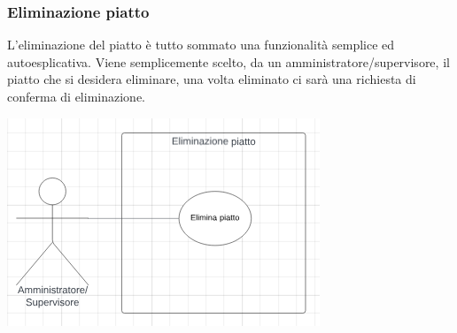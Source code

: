\subsubsection{Eliminazione piatto}
L'eliminazione del piatto è tutto sommato una funzionalità semplice ed autoesplicativa. Viene semplicemente scelto, da un amministratore/supervisore, il piatto che si desidera eliminare, una volta eliminato ci sarà una richiesta di conferma di eliminazione.
\begin{center}
  \includegraphics[scale=1.2]{img/use_case/use_case-eliminazione_piatto.png}
\end{center}
\newpage
